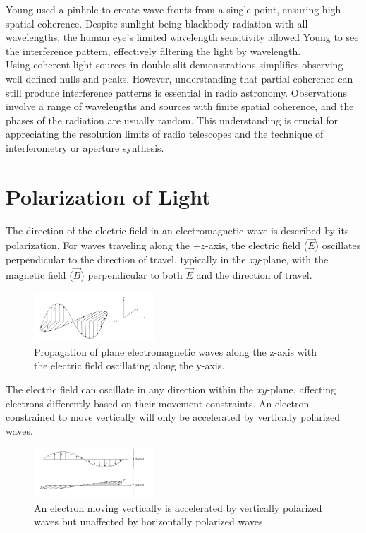 Young used a pinhole to create wave fronts from a single point, ensuring high spatial coherence. Despite sunlight being blackbody radiation with all wavelengths, the human eye's limited wavelength sensitivity allowed Young to see the interference pattern, effectively filtering the light by wavelength. \\

Using coherent light sources in double-slit demonstrations simplifies observing well-defined nulls and peaks. However, understanding that partial coherence can still produce interference patterns is essential in radio astronomy. Observations involve a range of wavelengths and sources with finite spatial coherence, and the phases of the radiation are usually random. This understanding is crucial for appreciating the resolution limits of radio telescopes and the technique of interferometry or aperture synthesis.

\section{Polarization of Light}

The direction of the electric field in an electromagnetic wave is described by its polarization. For waves traveling along the \(+z\)-axis, the electric field (\(\vec{E}\)) oscillates perpendicular to the direction of travel, typically in the \(xy\)-plane, with the magnetic field (\(\vec{B}\)) perpendicular to both \(\vec{E}\) and the direction of travel.

\begin{figure}[H]
    \centering
    \includegraphics[width=0.4\textwidth]{Images/polarization_wave.png}
    \caption{Propagation of plane electromagnetic waves along the z-axis with the electric field oscillating along the y-axis.}
    \label{fig:polarization_wave}
\end{figure}

The electric field can oscillate in any direction within the \(xy\)-plane, affecting electrons differently based on their movement constraints. An electron constrained to move vertically will only be accelerated by vertically polarized waves.

\begin{figure}[H]
    \centering
    \includegraphics[width=0.4\textwidth]{Images/polarization_electron.png}
    \caption{An electron moving vertically is accelerated by vertically polarized waves but unaffected by horizontally polarized waves.}
    \label{fig:polarization_electron}
\end{figure}

